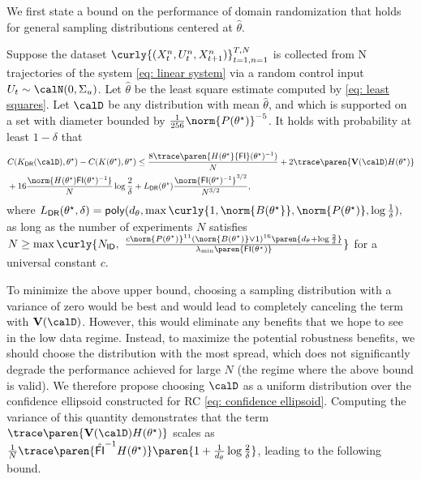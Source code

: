 We first state a bound on the performance of domain randomization that holds for general sampling distributions centered at $\hat \theta$. 
\begin{lemma}
    \label{lem: domain randomization general}
    Suppose the dataset $\curly{(X_t^n, U_t^n, X_{t+1}^n)}_{t=1, n=1}^{T,N}$ is collected from N trajectories of the system \eqref{eq: linear system} via a random control input $U_t \sim \calN(0, \Sigma_u)$. Let $\hat\theta$ be the least square estimate computed by \eqref{eq: least squares}. Let $\calD$ be any distribution with mean $\hat \theta$, and which is supported on a set with diameter bounded by $\frac{1}{256} \norm{P(\theta^\star)}^{-5}$.
    It holds with probability at least $1-\delta$ that 
    \begin{align}
        &C(K_{\mathsf{DR}}(\calD), \theta^\star) - C(K(\theta^\star), \theta^\star) \nonumber \leq \frac{8{\trace\paren{H(\theta^\star}{\mathsf{FI}}(\theta^\star)^{-1})}}{N} + 2\trace\paren{\mathbf{V}(\calD) H(\theta^\star)} \\& + 16\frac{\norm{H(\theta^\star)\mathsf{FI}(\theta^\star)^{-1}}}{N}\log\frac{2}{\delta} + L_{\mathsf{DR}}(\theta^\star)\frac{\norm{\mathsf{FI}(\theta^\star)^{-1}}^{3/2}}{N^{3/2}}, \label{eq:DR upper bound}
    \end{align}
    where $
        L_{\mathsf{DR}}(\theta^\star, \delta) = \mathsf{poly}(d_{\theta}, \max\curly{1, \norm{B(\theta^\star}}, \norm{P(\theta^\star)}, \log\frac{1}{\delta}),$ as long as the number of experiments $N$ satisfies $N \geq \max\curly{N_{\mathsf{ID}}, ~ \frac{c\norm{P(\theta^\star)}^{11} (\norm{B(\theta^\star)} \vee 1)^{16}\paren{d_\theta+\log\frac{2}{\delta}}}{\lambda_{\min}\paren{\mathsf{FI}(\theta^\star)}}}$ for a universal constant $c$.
\end{lemma}

To minimize the above upper bound, choosing a sampling distribution with a variance of zero would be best and would lead to completely canceling the term with $\mathbf{V}(\calD)$. However, this would eliminate any benefits that we hope to see in the low data regime. Instead, to maximize the potential robustness benefits, we should choose the distribution with the most spread, which does not significantly degrade the performance achieved for large $N$ (the regime where the above bound is valid). We therefore propose choosing $\calD$ as a uniform distribution over the confidence ellipsoid constructed for RC \eqref{eq: confidence ellipsoid}. Computing the variance of this quantity demonstrates that the term $\trace\paren{\mathbf{V}(\calD) H(\theta^\star)}$ scales as $\frac{1}{N}\trace\paren{\hat{\mathsf{FI}}^{-1} H(\theta^\star)}\paren{1 + \frac{1}{d_{\theta}}\log\frac{2}{\delta}}$, leading to the following bound. 

